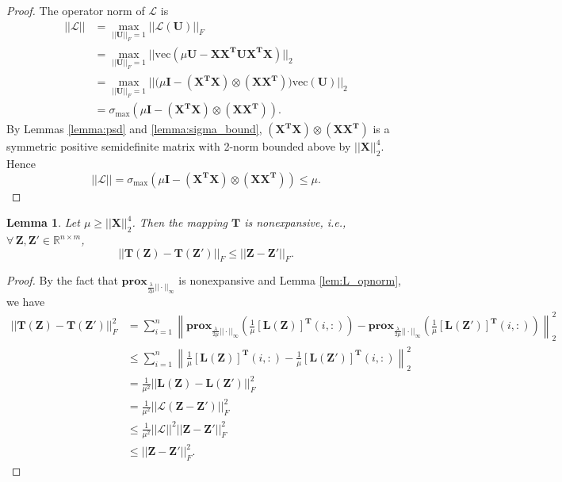 \documentclass[12pt]{article}
\newtheorem{lemma}[theorem]{Lemma}
\begin{document}
\begin{proof}
The operator norm of $\mathscr{L}$ is
\begin{equation*}
    \begin{split}
        || \mathscr{L} || & = \max_{||\mathbf{U}||_F = 1} || \mathscr{L}(\mathbf{U})||_F \\
        & = \max_{||\mathbf{U}||_F = 1} ||\text{vec}(\mu \mathbf{U} - \mathbf{XX^T U X^TX})||_ 2\\
        & = \max_{||\mathbf{U}||_F = 1} ||(\mu \mathbf{I} - \mathbf{(X^TX) \otimes (XX^T))}\text{vec}(\mathbf{U})||_2 \\  
        & = \sigma_{\text{max}}(\mu \mathbf{I} - \mathbf{(X^TX) \otimes (XX^T)}). 
    \end{split}
\end{equation*}
By Lemmas \ref{lemma:psd} and \ref{lemma:sigma_bound}, $\mathbf{(X^TX) \otimes (XX^T)}$ is a symmetric positive semidefinite matrix with 2-norm bounded above by $||\mathbf{X}||_2^4$.  Hence 
\[
  || \mathscr{L} || = \sigma_{\text{max}}(\mu \mathbf{I} - \mathbf{(X^TX) \otimes (XX^T)}) \leq \mu.
\]    
\end{proof}

\begin{lemma}
\label{lem:nonexp}
Let $\mu \geq ||\mathbf{X}||_2^4$.  Then the mapping $\mathbf{T}$ is nonexpansive, i.e., $\forall \, \mathbf{Z}, \mathbf{Z'} \in \mathbb{R}^{n \times m}$,
\[
||\mathbf{T(Z)}-\mathbf{T(Z')}||_{F} \leq ||\mathbf{Z}-\mathbf{Z'}||_{F}.
\]
\end{lemma}

\begin{proof}

By the fact that $\textbf{prox}_{\frac{\lambda}{2\mu} ||\cdot||_\infty}$ is nonexpansive \cite{parikh_boyd_2014} and Lemma \ref{lem:L_opnorm}, we have 
\begin{equation*}
    \begin{split}
        ||\mathbf{T(Z)}-\mathbf{T(Z')}||^2_{F} & = \sum_{i=1}^n \left\| \textbf{prox}_{\frac{\lambda}{2\mu} ||\cdot||_\infty} \left(\frac{1}{\mu}\mathbf{[L(Z)]^T}(i,:) \right) -  \textbf{prox}_{\frac{\lambda}{2\mu} ||\cdot||_\infty} \left( \frac{1}{\mu}\mathbf{[L(Z')]^T}(i,:) \right) \right \|_2^2  \\
        & \leq \sum_{i=1}^n \left\| \frac{1}{\mu}\mathbf{[L(Z)]^T}(i,:) - \frac{1}{\mu}\mathbf{[L(Z')]^T}(i,:) \right \|_2^2 \\
        & = \frac{1}{\mu^2} ||\mathbf{L(Z)}-\mathbf{L(Z')}||^2_{F} \\
        & = \frac{1}{\mu^2} ||\mathscr{L}(\mathbf{Z - Z'}) ||^2_{F} \\
        & \leq  \frac{1}{\mu^2} ||\mathscr{L}||^2 ||\mathbf{Z} - \mathbf{Z'}||_F^2 \\
        & \leq ||\mathbf{Z} - \mathbf{Z'}||_F^2.
    \end{split}
\end{equation*}


\end{proof}
\end{document}
